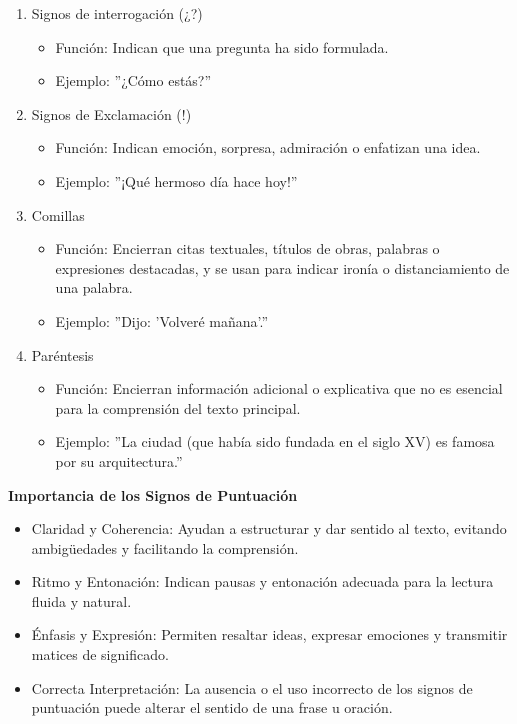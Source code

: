 \begin{enumerate}
      \item Signos de interrogación (¿?)
            \begin{itemize}
                  \item Función: Indican que una pregunta ha sido formulada.
                  \item Ejemplo: ''¿Cómo estás?''
            \end{itemize}
      \item Signos de Exclamación (!)
            \begin{itemize}
                  \item Función: Indican emoción, sorpresa, admiración o enfatizan una idea.
                  \item Ejemplo: ''¡Qué hermoso día hace hoy!''
            \end{itemize}
      \item Comillas
            \begin{itemize}
                  \item Función: Encierran citas textuales, títulos de obras, palabras o expresiones destacadas, y se usan para indicar ironía o distanciamiento de una palabra.
                  \item Ejemplo: ''Dijo: 'Volveré mañana'.''
            \end{itemize}
      \item Paréntesis
            \begin{itemize}
                  \item Función: Encierran información adicional o explicativa que no es esencial para la comprensión del texto principal.
                  \item Ejemplo: ''La ciudad (que había sido fundada en el siglo XV) es famosa por su arquitectura.''
            \end{itemize}
\end{enumerate}

\textbf{Importancia de los Signos de Puntuación}

\begin{itemize}
      \item Claridad y Coherencia: Ayudan a estructurar y dar sentido al texto, evitando ambigüedades y facilitando la comprensión.
      \item Ritmo y Entonación: Indican pausas y entonación adecuada para la lectura fluida y natural.
      \item Énfasis y Expresión: Permiten resaltar ideas, expresar emociones y transmitir matices de significado.
      \item Correcta Interpretación: La ausencia o el uso incorrecto de los signos de puntuación puede alterar el sentido de una frase u oración.
\end{itemize}

